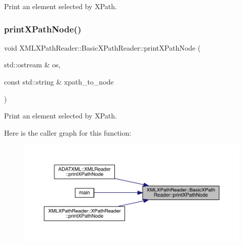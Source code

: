 Print an element selected by X\+Path. 

\mbox{\label{classXMLXPathReader_1_1BasicXPathReader_afba694dbda7c2e1c26ca344085bfffb6}} 
\subsubsection{\texorpdfstring{printXPathNode()}{printXPathNode()}\hspace{0.1cm}{\footnotesize\ttfamily [2/2]}}
{\footnotesize\ttfamily void X\+M\+L\+X\+Path\+Reader\+::\+Basic\+X\+Path\+Reader\+::print\+X\+Path\+Node (\begin{DoxyParamCaption}\item[{std\+::ostream \&}]{os,  }\item[{const std\+::string \&}]{xpath\+\_\+to\+\_\+node }\end{DoxyParamCaption})}



Print an element selected by X\+Path. 

Here is the caller graph for this function\+:
\nopagebreak
\begin{figure}[H]
\begin{center}
\leavevmode
\includegraphics[width=350pt]{d6/dbf/classXMLXPathReader_1_1BasicXPathReader_afba694dbda7c2e1c26ca344085bfffb6_icgraph}
\end{center}
\end{figure}
\mbox{\label{classXMLXPathReader_1_1BasicXPathReader_a6c6d6e977694344a70506a24bebe853d}} 
